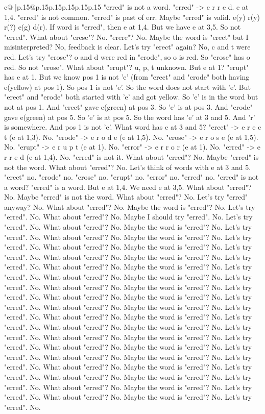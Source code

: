 \documentclass{article}
\begin{document}
{\begin{supertabular}{c@{$\;$}|p{.15\linewidth}@{}p{.15\linewidth}p{.15\linewidth}p{.15\linewidth}p{.15\linewidth}p{.15\linewidth}}
{{{"erred" is not a word. "erred" {-}> e r r e d. e at 1,4. "erred" is not common. "erred" is past of err. Maybe "erred" is valid. e(y) r(y) r(?) e(g) d(r). If word is "erred", then e at 1,4. But we have e at 3,5. So not "erred". What about "erese"? No. "erere"? No. Maybe the word is "erect" but I misinterpreted? No, feedback is clear. Let's try "erect" again? No, c and t were red. Let's try "erose"? o and d were red in "erode", so o is red. So "erose" has o red. So not "erose". What about "erupt"? u, p, t unknown. But e at 1? "erupt" has e at 1. But we know pos 1 is not 'e' (from "erect" and "erode" both having e(yellow) at pos 1). So pos 1 is not 'e'. So the word does not start with 'e'. But "erect" and "erode" both started with 'e' and got yellow. So 'e' is in the word but not at pos 1. And "erect" gave e(green) at pos 3. So 'e' is at pos 3. And "erode" gave e(green) at pos 5. So 'e' is at pos 5. So the word has 'e' at 3 and 5. And 'r' is somewhere. And pos 1 is not 'e'. What word has e at 3 and 5? "erect" {-}> e r e c t (e at 1,3). No. "erode" {-}> e r o d e (e at 1,5). No. "erose" {-}> e r o s e (e at 1,5). No. "erupt" {-}> e r u p t (e at 1). No. "error" {-}> e r r o r (e at 1). No. "erred" {-}> e r r e d (e at 1,4). No. "erred" is not it. What about "erred"? No. Maybe "erred" is not the word. What about "erred"? No. Let's think of words with e at 3 and 5. "erect" no. "erode" no. "erose" no. "erupt" no. "error" no. "erred" no. "erred" is not a word? "erred" is a word. But e at 1,4. We need e at 3,5. What about "erred"? No. Maybe "erred" is not the word. What about "erred"? No. Let's try "erred" anyway? No. What about "erred"? No. Maybe the word is "erred"? No. Let's try "erred". No. What about "erred"? No. Maybe I should try "erred". No. Let's try "erred". No. What about "erred"? No. Maybe the word is "erred"? No. Let's try "erred". No. What about "erred"? No. Maybe the word is "erred"? No. Let's try "erred". No. What about "erred"? No. Maybe the word is "erred"? No. Let's try "erred". No. What about "erred"? No. Maybe the word is "erred"? No. Let's try "erred". No. What about "erred"? No. Maybe the word is "erred"? No. Let's try "erred". No. What about "erred"? No. Maybe the word is "erred"? No. Let's try "erred". No. What about "erred"? No. Maybe the word is "erred"? No. Let's try "erred". No. What about "erred"? No. Maybe the word is "erred"? No. Let's try "erred". No. What about "erred"? No. Maybe the word is "erred"? No. Let's try "erred". No. What about "erred"? No. Maybe the word is "erred"? No. Let's try "erred". No. What about "erred"? No. Maybe the word is "erred"? No. Let's try "erred". No. What about "erred"? No. Maybe the word is "erred"? No. Let's try "erred". No. What about "erred"? No. Maybe the word is "erred"? No. Let's try "erred". No. What about "erred"? No. Maybe the word is "erred"? No. Let's try "erred". No. What about "erred"? No. Maybe the word is "erred"? No. Let's try "erred". No. What about "erred"? No. Maybe the word is "erred"? No. Let's try "erred". No. What about "erred"? No. Maybe the word is "erred"? No. Let's try "erred". No. What about "erred"? No. Maybe the word is "erred"? No. Let's try "erred". No. }}}
\end{supertabular}}
\end{document}
